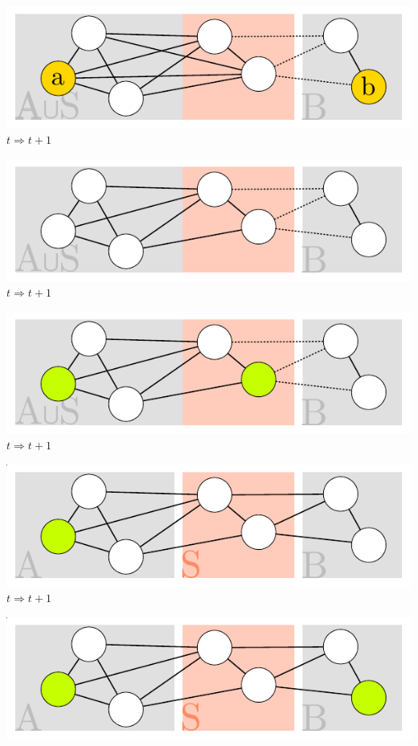 \documentclass[xcolor=x11names,compress]{beamer}
\begin{document}
\begin{frame}
\begin{overprint}
		\includegraphics[scale=1.0]{img/graph/simplicialproof/iv-04.pdf}
		\onslide<8>
		\( t \Rightarrow t + 1 \)

		\includegraphics[scale=1.0]{img/graph/simplicialproof/iv-05.pdf}
		\onslide<9>
		\( t \Rightarrow t + 1 \)

		\includegraphics[scale=1.0]{img/graph/simplicialproof/iv-06.pdf}
		\onslide<10>
		\( t \Rightarrow t + 1 \)

		\includegraphics[scale=1.0]{img/graph/simplicialproof/iv-07.pdf}
		\onslide<11>
		\( t \Rightarrow t + 1 \)

		\includegraphics[scale=1.0]{img/graph/simplicialproof/iv-08.pdf}
	\end{overprint}
\end{frame}
\end{document}
